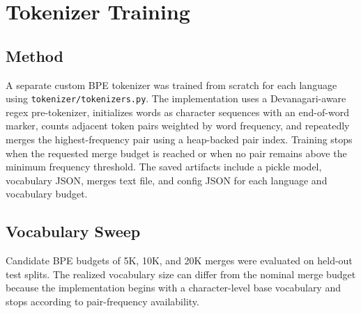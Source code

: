\documentclass[11pt]{article}
\begin{document}
\section{Tokenizer Training}

\subsection{Method}
A separate custom BPE tokenizer was trained from scratch for each language
using \texttt{tokenizer/\allowbreak tokenizers.py}. The implementation uses a
Devanagari-aware regex pre-tokenizer, initializes words as character
sequences with an end-of-word marker, counts adjacent token pairs weighted by
word frequency, and repeatedly merges the highest-frequency pair using a
heap-backed pair index. Training stops when the requested merge budget is
reached or when no pair remains above the minimum frequency threshold. The
saved artifacts include a pickle model, vocabulary JSON, merges text file,
and config JSON for each language and vocabulary budget.

\subsection{Vocabulary Sweep}
Candidate BPE budgets of 5K, 10K, and 20K merges were evaluated on held-out
test splits. The realized vocabulary size can differ from the nominal merge
budget because the implementation begins with a character-level base
vocabulary and stops according to pair-frequency availability.

\begin{table}[H]
\centering
\caption{Tokenizer sweep}
\end{table}
\end{document}
